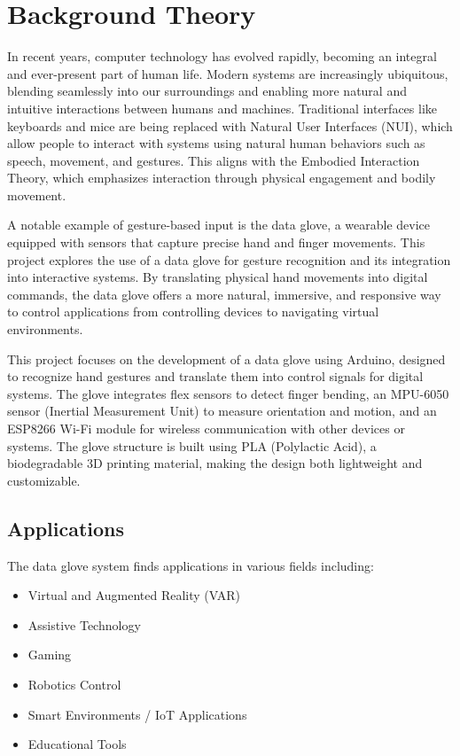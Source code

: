 \section{Background Theory}
In recent years, computer technology has evolved rapidly, becoming an integral and ever-present part of human life. Modern systems are increasingly ubiquitous, blending seamlessly into our surroundings and enabling more natural and intuitive interactions between humans and machines. Traditional interfaces like keyboards and mice are being replaced with Natural User Interfaces (NUI), which allow people to interact with systems using natural human behaviors such as speech, movement, and gestures. This aligns with the Embodied Interaction Theory, which emphasizes interaction through physical engagement and bodily movement.

A notable example of gesture-based input is the data glove, a wearable device equipped with sensors that capture precise hand and finger movements. This project explores the use of a data glove for gesture recognition and its integration into interactive systems. By translating physical hand movements into digital commands, the data glove offers a more natural, immersive, and responsive way to control applications from controlling devices to navigating virtual environments.

This project focuses on the development of a data glove using Arduino, designed to recognize hand gestures and translate them into control signals for digital systems. The glove integrates flex sensors to detect finger bending, an MPU-6050 sensor (Inertial Measurement Unit) to measure orientation and motion, and an ESP8266 Wi-Fi module for wireless communication with other devices or systems. The glove structure is built using PLA (Polylactic Acid), a biodegradable 3D printing material, making the design both lightweight and customizable.

\subsection{Applications}
The data glove system finds applications in various fields including:
\begin{itemize}
    \item Virtual and Augmented Reality (VAR)
    \item Assistive Technology
    \item Gaming
    \item Robotics Control
    \item Smart Environments / IoT Applications
    \item Educational Tools
\end{itemize}

